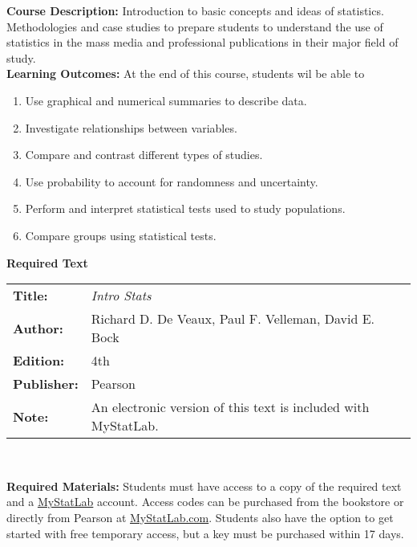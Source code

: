 \documentclass[10pt]{article}
\begin{document}
\textbf{Course Description:} Introduction to basic concepts and ideas of statistics. Methodologies and case studies to prepare students to understand the use of statistics in the mass media and professional publications in their major field of study.\\

\textbf{Learning Outcomes:} At the end of this course, students wil be
able to
\begin{enumerate}[nolistsep]
  \item Use graphical and numerical summaries to describe data.
  \item Investigate relationships between variables.
  \item Compare and contrast different types of studies.
  \item Use probability to account for randomness and uncertainty.
  \item Perform and interpret statistical tests used to study
    populations.
  \item Compare groups using statistical tests.
\end{enumerate}

\vspace{10pt}

\textbf{Required Text}\\
\begin{tabular}{l p{10cm}}
  \textbf{Title:} & \emph{Intro Stats}\\
  \textbf{Author:} & Richard D. De Veaux, Paul F. Velleman, David E. Bock\\
  \textbf{Edition:} & 4th\\
  \textbf{Publisher:} & Pearson\\
  \textbf{Note:} & An electronic version of this text is included with
    MyStatLab.
\end{tabular}\\
\vspace{10pt}

\textbf{Required Materials:} Students must have access to a copy of
the required text and a \href{mystatlab.com}{MyStatLab} account.
Access codes can be purchased from the bookstore or directly
from Pearson at \href{mystatlab.com}{MyStatLab.com}.  Students also
have the option to get started with free temporary access, but a key must be
purchased within 17 days.\\
\end{document}
